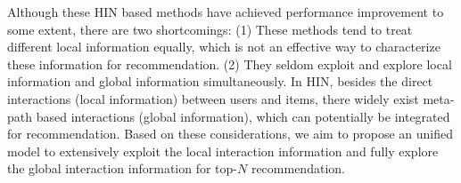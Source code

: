 Although these HIN based methods have achieved performance improvement to some extent, there are two shortcomings: 
(1) These methods tend to treat different local information equally, which is not an effective way to characterize these information for recommendation.
(2) They seldom exploit and explore local information and global information simultaneously. In HIN, besides the direct interactions (local information) between users and items, there widely exist meta-path based interactions (global information), which can potentially be integrated for recommendation.
Based on these considerations, we aim to propose an unified model to extensively exploit the local interaction information and fully explore the global interaction information for top-$N$ recommendation. 

